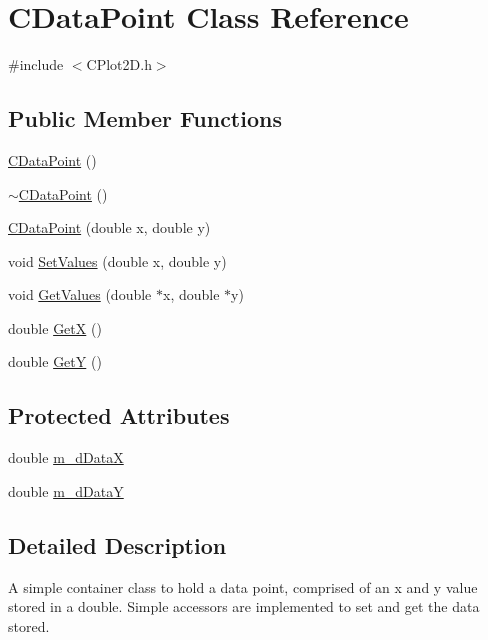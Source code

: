 \hypertarget{class_c_data_point}{\section{C\-Data\-Point Class Reference}
\label{class_c_data_point}
}


{\ttfamily \#include $<$C\-Plot2\-D.\-h$>$}

\subsection*{Public Member Functions}
\begin{DoxyCompactItemize}
\item 
\hyperlink{class_c_data_point_aff1e3e57703db79d1052c38063689790}{C\-Data\-Point} ()
\item 
\hyperlink{class_c_data_point_ab520e4ab994b143e445ee3803908ac17}{$\sim$\-C\-Data\-Point} ()
\item 
\hyperlink{class_c_data_point_ac9e0c9b27b4e1aefe5138eb03f2f8bf8}{C\-Data\-Point} (double x, double y)
\item 
void \hyperlink{class_c_data_point_a4a671e7d5e26ce8819be70af6e5f264c}{Set\-Values} (double x, double y)
\item 
void \hyperlink{class_c_data_point_a1d4c789a856bf36decb8bd762ddc05ad}{Get\-Values} (double $\ast$x, double $\ast$y)
\item 
double \hyperlink{class_c_data_point_a6800ff14238e9e98e667493e4375fffe}{Get\-X} ()
\item 
double \hyperlink{class_c_data_point_a2182d6d3f75387a391653c4bfa6fa548}{Get\-Y} ()
\end{DoxyCompactItemize}
\subsection*{Protected Attributes}
\begin{DoxyCompactItemize}
\item 
double \hyperlink{class_c_data_point_af3fc9273d4004fb92574da20b1579049}{m\-\_\-d\-Data\-X}
\item 
double \hyperlink{class_c_data_point_adfb8d913ab8045ad78b85a6cf0edb48c}{m\-\_\-d\-Data\-Y}
\end{DoxyCompactItemize}


\subsection{Detailed Description}
A simple container class to hold a data point, comprised of an x and y value stored in a double. Simple accessors are implemented to set and get the data stored. 

